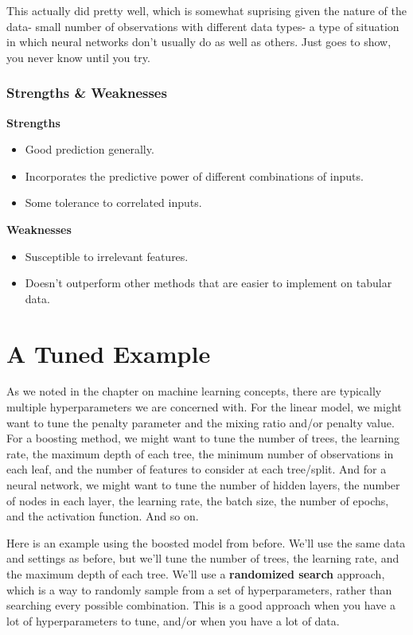 \documentclass[
  letterpaper,
]{krantz}
\providecommand{\tightlist}{%
  \setlength{\itemsep}{0pt}\setlength{\parskip}{0pt}}\usepackage{longtable,booktabs,array}
\begin{document}
This actually did pretty well, which is somewhat suprising given the
nature of the data- small number of observations with different data
types- a type of situation in which neural networks don't usually do as
well as others. Just goes to show, you never know until you try.

\subsubsection{Strengths \& Weaknesses}\label{strengths-weaknesses-2}

\textbf{Strengths}

\begin{itemize}
\tightlist
\item
  Good prediction generally.
\item
  Incorporates the predictive power of different combinations of inputs.
\item
  Some tolerance to correlated inputs.
\end{itemize}

\textbf{Weaknesses}

\begin{itemize}
\tightlist
\item
  Susceptible to irrelevant features.
\item
  Doesn't outperform other methods that are easier to implement on
  tabular data.
\end{itemize}

\section{A Tuned Example}\label{a-tuned-example}

As we noted in the chapter on machine learning concepts, there are
typically multiple hyperparameters we are concerned with. For the linear
model, we might want to tune the penalty parameter and the mixing ratio
and/or penalty value. For a boosting method, we might want to tune the
number of trees, the learning rate, the maximum depth of each tree, the
minimum number of observations in each leaf, and the number of features
to consider at each tree/split. And for a neural network, we might want
to tune the number of hidden layers, the number of nodes in each layer,
the learning rate, the batch size, the number of epochs, and the
activation function. And so on.

Here is an example using the boosted model from before. We'll use the
same data and settings as before, but we'll tune the number of trees,
the learning rate, and the maximum depth of each tree. We'll use a
\textbf{randomized search} approach, which is a way to randomly sample
from a set of hyperparameters, rather than searching every possible
combination. This is a good approach when you have a lot of
hyperparameters to tune, and/or when you have a lot of data.
\end{document}
